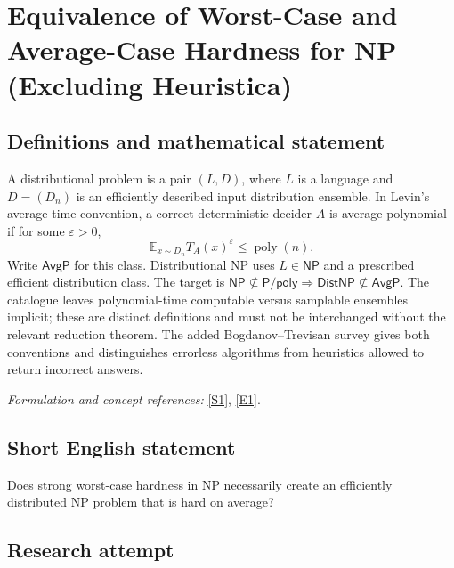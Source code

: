 \documentclass[11pt]{article}
\newcommand{\sref}[2]{\hyperlink{source:#1:#2}{[S#2]}}
\newcommand{\eref}[2]{\hyperlink{extra:#1:#2}{[E#2]}}
\newif\ifshowcatalogue
\newcommand{\cataloguescope}[1]{\ifshowcatalogue
 \paragraph{Exact scope in the supplied catalogue.}
 \begin{quote}\small #1\end{quote}\fi}
\begin{document}
\setcounter{section}{51}
\clearpage
\section{\texorpdfstring{Equivalence of Worst-Case and Average-Case Hardness for NP (Excluding Heuristica)}{Equivalence of Worst-Case and Average-Case Hardness for NP (Excluding Heuristica)}}\label{52}
\subsection{Definitions and mathematical statement}
A distributional problem is a pair $(L,D)$, where $L$ is a language and $D=(D_n)$ is an efficiently described input distribution ensemble. In Levin's average-time convention, a correct deterministic decider $A$ is average-polynomial if for some $\varepsilon>0$,
\[
 \mathbb E_{x\sim D_n} T_A(x)^\varepsilon\le\operatorname{poly}(n).
\]
Write $\mathsf{AvgP}$ for this class. Distributional NP uses $L\in\mathsf{NP}$ and a prescribed efficient distribution class. The target is $\mathsf{NP}\nsubseteq\mathsf{P/poly}\Rightarrow\mathsf{DistNP}\nsubseteq\mathsf{AvgP}$. The catalogue leaves polynomial-time computable versus samplable ensembles implicit; these are distinct definitions and must not be interchanged without the relevant reduction theorem. The added Bogdanov--Trevisan survey gives both conventions and distinguishes errorless algorithms from heuristics allowed to return incorrect answers.
\par\smallskip\textit{Formulation and concept references:} \sref{52}{1}, \eref{52}{1}.
\cataloguescope{Prove or disprove that if NP is hard in the worst case (NP not in P/poly), then NP is hard on average (DistNP not in AvgP).}
\subsection{Short English statement}
Does strong worst-case hardness in NP necessarily create an efficiently distributed NP problem that is hard on average?
\subsection{Research attempt}
\end{document}
